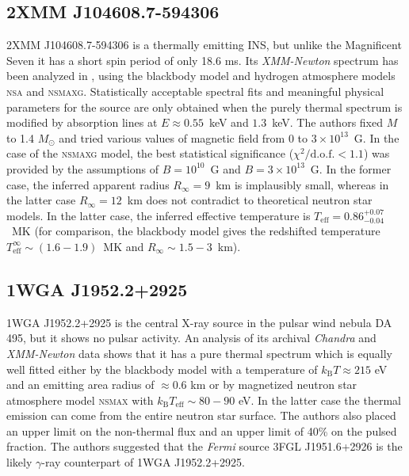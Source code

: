 \documentclass{pos1}
\newcommand{\kB}{k_\mathrm{B}}
\newcommand{\Teff}{T_\mathrm{eff}}
\begin{document}
\subsection{2XMM J104608.7-594306}


2XMM J104608.7-594306 is a thermally emitting INS, but unlike the
Magnificent Seven it has a short spin period of only 18.6 ms. Its
\textit{XMM-Newton} spectrum has been analyzed in \cite{Pires_ea15},
using the blackbody model and hydrogen atmosphere models \textsc{nsa}
and \textsc{nsmaxg}. Statistically acceptable spectral fits and
meaningful physical parameters for the source are only obtained when
the purely thermal spectrum is modified by absorption lines at
$E\approx0.55$~keV and $1.3$~keV. The authors fixed $M$ to 1.4
$M_\odot$ and tried various values of magnetic field from 0 to
$3\times10^{13}$~G. In the case of the \textsc{nsmaxg} model, the best
statistical significance ($\chi^2/\mbox{d.o.f.}<1.1$) was provided by
the assumptions of $B=10^{10}$~G and $B=3\times10^{13}$~G. In the
former case, the inferred apparent radius $R_\infty=9$~km is
implausibly small, whereas in the latter case $R_\infty=12$~km does
not contradict to theoretical neutron star models. In the latter
case, the inferred effective temperature is
$\Teff=0.86^{+0.07}_{-0.04}$~MK (for comparison, the blackbody
model gives the redshifted temperature $\Teff^\infty\sim
(1.6-1.9)$~MK and $R_\infty\sim1.5-3$~km).

\subsection{1WGA J1952.2+2925}

1WGA J1952.2+2925 is the central X-ray source in the pulsar
wind nebula DA 495, but it shows no pulsar activity. An analysis
\cite{Karpova_ea15} of its archival \textit{Chandra} and
\textit{XMM-Newton} data shows that it has a pure thermal spectrum which is
equally well fitted either by the blackbody model with a temperature
of $\kB T \approx 215$ eV and an emitting area radius of $\approx 0.6$
km or by magnetized neutron star atmosphere model \textsc{nsmax} with
$\kB \Teff \sim 80-90$ eV. In the latter case the thermal emission can
come from the entire neutron star surface. The authors
\cite{Karpova_ea15} also placed an upper limit on the non-thermal flux
and an upper limit of 40\% on the pulsed fraction. The authors
suggested that the \textit{Fermi} source 3FGL J1951.6+2926 is the
likely $\gamma$-ray counterpart of 1WGA J1952.2+2925. 
\end{document}
